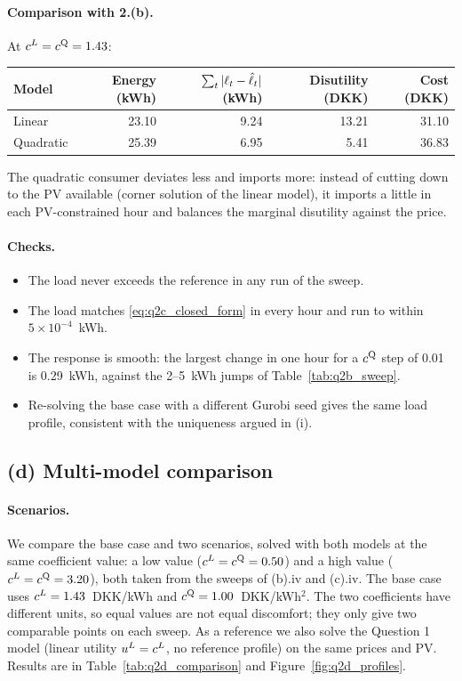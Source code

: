 \paragraph{Comparison with 2.(b).} At $c^{L} = c^{\mathrm{Q}} = 1.43$:
\begin{center}
\small
\begin{tabular}{lrrrr}
    \toprule
    Model & Energy (kWh) & $\sum_t |\ell_{t} - \hat{\ell}_{t}|$ (kWh) & Disutility (DKK) & Cost (DKK) \\
    \midrule
    Linear    & 23.10 & 9.24 & 13.21 & 31.10 \\
    Quadratic & 25.39 & 6.95 &  5.41 & 36.83 \\
    \bottomrule
\end{tabular}
\end{center}
The quadratic consumer deviates less and imports more: instead of cutting down to the PV
available (corner solution of the linear model), it imports a little in each PV-constrained hour
and balances the marginal disutility against the price.

\paragraph{Checks.}
\begin{itemize}
    \item The load never exceeds the reference in any run of the sweep.
    \item The load matches \eqref{eq:q2c_closed_form} in every hour and run to within
    $5\times10^{-4}$~kWh.
    \item The response is smooth: the largest change in one hour for a $c^{\mathrm{Q}}$ step of 0.01 is
    0.29~kWh, against the 2--5~kWh jumps of Table~\ref{tab:q2b_sweep}.
    \item Re-solving the base case with a different Gurobi seed gives the same load profile,
    consistent with the uniqueness argued in (i).
\end{itemize}


\subsection{(d) Multi-model comparison}

\paragraph{Scenarios.} We compare the base case and two scenarios, solved with both models at the same coefficient value: a low value ($c^{L} = c^{\mathrm{Q}} = 0.50$) and a high value
($c^{L} = c^{\mathrm{Q}} = 3.20$), both taken from the sweeps of (b).iv and (c).iv. The base case uses $c^{L} = 1.43$~DKK/kWh and $c^{\mathrm{Q}} = 1.00$~DKK/kWh$^2$. The two coefficients have different units,
so equal values are not equal discomfort; they only give two comparable points on each sweep. As a reference we also solve the Question 1 model (linear utility $u^L = c^{L}$, no reference
profile) on the same prices and PV. Results are in Table~\ref{tab:q2d_comparison} and Figure~\ref{fig:q2d_profiles}.

